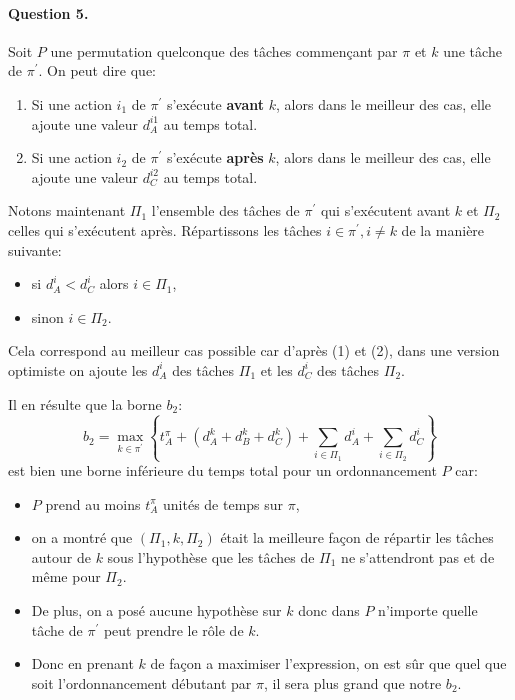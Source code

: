 \documentclass[a4paper, 10pt]{article}
\begin{document}
		\paragraph{Question 5.}{Soit $P$ une permutation quelconque des tâches commençant par $\pi$ et $k$ une tâche de $\pi^\prime$. On peut dire que:
		\begin{enumerate}
			\item Si une action $i_1$ de $\pi^\prime$ s'exécute \textbf{avant} $k$, alors dans le meilleur des cas, elle ajoute une valeur $d^{i1}_A$ au temps total. 
			\item Si une action $i_2$ de $\pi^\prime$  s'exécute \textbf{après} $k$, alors dans le meilleur des cas, elle ajoute une valeur $d^{i2}_C$ au temps total.
		\end{enumerate}
		
		Notons maintenant $\Pi_1$ l'ensemble des tâches de $\pi^\prime$ qui s'exécutent avant $k$ et $\Pi_2$ celles qui s'exécutent après. Répartissons les tâches $i \in \pi^\prime, i \ne k$ de la manière suivante:
		\begin{itemize}
			\item si $d^i_A < d^i_C$ alors $i \in \Pi_1$,
			\item sinon $i \in \Pi_2$.
		\end{itemize}
		Cela correspond au meilleur cas possible car d'après (1) et (2), dans une version optimiste on ajoute les $d^i_A$ des tâches $\Pi_1$ et les $d^i_C$ des tâches $\Pi_2$.
		
		Il en résulte que la borne $b_2$:
		\begin{equation*}
			b_2 = \max_{k \in \pi^\prime} \left\{ t^{\pi}_A + \left(d^k_A + d^k_B + d^k_C \right) + \sum_{i \in \Pi_1} d^i_A + \sum_{i \in \Pi_2} d^i_C \right\}
		\end{equation*}
		est bien une borne inférieure du temps total pour un ordonnancement $P$ car:
		\begin{itemize}
			\item $P$ prend au moins $t^\pi_A$ unités de temps sur $\pi$,
			\item on a montré que $\left(\Pi_1, k, \Pi_2\right)$ était la meilleure façon de répartir les tâches autour de $k$ sous l'hypothèse que les tâches de $\Pi_1$ ne s'attendront pas et de même pour $\Pi_2$.
			\item De plus, on a posé aucune hypothèse sur $k$ donc dans $P$ n'importe quelle tâche de $\pi^\prime$ peut prendre le rôle de $k$.
                        \item Donc en prenant $k$ de façon a maximiser l'expression, on est sûr que quel que soit l'ordonnancement débutant par $\pi$, il sera plus grand que notre $b_2$.
		\end{itemize}
		}
		
\end{document}
